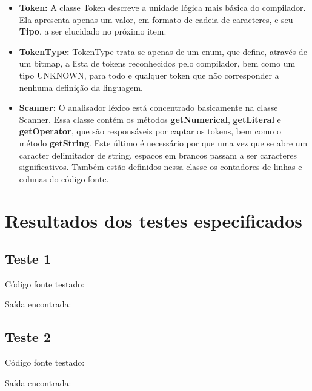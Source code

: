 \documentclass[11pt]{article}
\begin{document}
		
		\begin{itemize}
			
			\item \textbf{Token: }A classe Token descreve a unidade lógica mais básica do compilador. Ela apresenta apenas um valor, em formato de cadeia de caracteres, e seu \textbf{Tipo}, a ser elucidado no próximo item. 
			
			\item \textbf{TokenType: } TokenType trata-se apenas de um enum, que define, através de um bitmap, a lista de tokens reconhecidos pelo compilador, bem como um tipo UNKNOWN, para todo e qualquer token que não corresponder a nenhuma definição da linguagem.
			
			\item \textbf{Scanner: } O analisador léxico está concentrado basicamente na classe Scanner. Essa classe contém os métodos \textbf{getNumerical}, \textbf{getLiteral} e \textbf{getOperator}, que são responsáveis por captar os tokens, bem como o método \textbf{getString}. Este último é necessário por que uma vez que se abre um caracter delimitador de string, espacos em brancos passam a ser caracteres significativos. Também estão definidos nessa classe os contadores de linhas e colunas do código-fonte.
		
		\end{itemize}
		

\newpage
\section{Resultados dos testes especificados}


	\subsection{Teste 1}
	
		Código fonte testado:
		
			
		Saída encontrada:
		
	
	
	\subsection{Teste 2}
		
		Código fonte testado:
		
			
		Saída encontrada:
		
\end{document}
